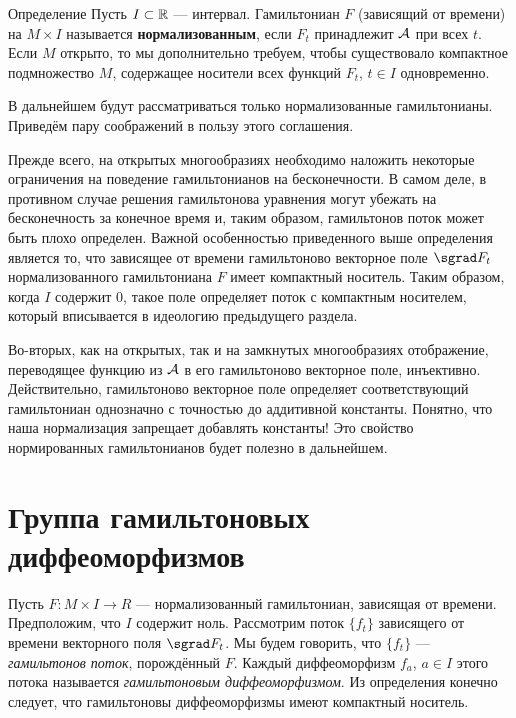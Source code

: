 \begin{ex}{Определение}
Пусть $I \subset \mathbb{R}$ — интервал.
Гамильтониан $F$ (зависящий от времени) на $M \times I$ называется \textbf{нормализованным}, если $F_t$ принадлежит $\mathcal{A}$ при всех $t$.
Если $M$ открыто, то мы дополнительно требуем, чтобы существовало компактное подмножество $M$, содержащее носители всех функций $F_t$, $t \in I$ одновременно.
\end{ex}

В дальнейшем будут рассматриваться только нормализованные гамильтонианы.
Приведём пару соображений в пользу этого соглашения.

Прежде всего, на открытых многообразиях необходимо наложить некоторые ограничения на поведение гамильтонианов на бесконечности.
В самом деле, в противном случае решения гамильтонова уравнения могут
убежать на бесконечность за конечное время и, таким образом, гамильтонов поток может быть плохо определен.
Важной особенностью приведенного выше определения является то, что зависящее от времени гамильтоново векторное поле $\sgrad F_t$ нормализованного гамильтониана $F$ имеет компактный носитель.
Таким образом, когда $I$ содержит $0$, такое поле определяет поток с компактным носителем, который вписывается в идеологию предыдущего раздела.

Во-вторых, как на открытых, так и на замкнутых многообразиях отображение, переводящее функцию из $\mathcal{A}$ в его гамильтоново векторное поле, инъективно.
Действительно, гамильтоново векторное поле определяет соответствующий гамильтониан однозначно с точностью до аддитивной константы.
Понятно, что наша нормализация запрещает добавлять константы!
Это свойство нормированных гамильтонианов будет полезно в дальнейшем.

\section[Группа гамильтоновых диффеоморфизмов]{Группа гамильтоновых\\диффеоморфизмов}\label{1.4}

Пусть $F: M \times I \to R$ — нормализованный гамильтониан, зависящая от времени.
Предположим, что $I$ содержит ноль.
Рассмотрим поток $\{f_t\}$ зависящего от времени векторного поля $\sgrad F_t$.
Мы будем говорить, что $\{f_t\}$ — \emph{гамильтонов поток}, порождённый $F$.
Каждый диффеоморфизм $f_a$, $a \in I$ этого потока называется \emph{гамильтоновым диффеоморфизмом}.
Из определения конечно следует, что гамильтоновы диффеоморфизмы имеют компактный носитель.

